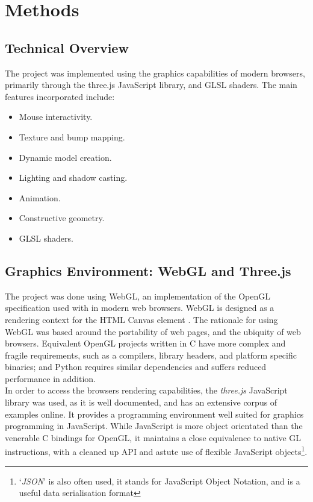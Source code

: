 \section{Methods} %
\label{sec:methods}

    \subsection{Technical Overview} %
    \label{sub:technical_overview}
        The project was implemented using the graphics capabilities of modern browsers, primarily through the three.js JavaScript library, and GLSL shaders.
        The main features incorporated include:
        \begin{itemize}
            \item Mouse interactivity.
            \item Texture and bump mapping.
            \item Dynamic model creation.
            \item Lighting and shadow casting.
            \item Animation.
            \item Constructive geometry.
            \item GLSL shaders.
        \end{itemize}

    \subsection{Graphics Environment: WebGL and Three.js} %
    \label{sub:graphics_environment_webgl_and_three_js}
        The project was done using WebGL, an implementation of the OpenGL specification used with in modern web browsers.
        WebGL is designed as a rendering context for the HTML Canvas element \cite{khronos_webgl}.
        The rationale for using WebGL was based around the portability of web pages, and the ubiquity of web browsers.
        Equivalent OpenGL projects written in C have more complex and fragile requirements, such as a compilers, library headers, and platform specific binaries; and Python requires similar dependencies and suffers reduced performance in addition.\\

        In order to access the browsers rendering capabilities, the \textit{three.js} JavaScript library was used, as it is well documented, and has an extensive corpus of examples online.
        It provides a programming environment well suited for graphics programming in JavaScript.
        While JavaScript is more object orientated than the venerable C bindings for OpenGL, it maintains a close equivalence to native GL instructions, with a cleaned up API and astute use of flexible JavaScript objects\footnote{`\textit{JSON}' is also often used, it stands for JavaScript Object Notation, and is a useful data serialisation format}.

